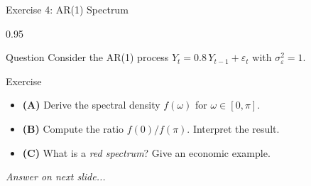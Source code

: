 \documentclass[9pt, aspectratio=169, t]{beamer}
\begin{document}
\begin{frame}{Exercise 4: AR(1) Spectrum}
    \begin{cminipage}{0.95\textwidth}
    \begin{alertblock}{Question}
        Consider the AR(1) process $Y_t = 0.8\,Y_{t-1} + \varepsilon_t$ with $\sigma^2_\varepsilon = 1$.
    \end{alertblock}

    \vspace{0.2cm}

    \begin{block}{Exercise}
        \begin{itemize}\setlength{\itemsep}{3pt}
            \item \textcolor{MainBlue}{\textbf{(A)}} Derive the spectral density $f(\omega)$ for $\omega \in [0, \pi]$.
            \item \textcolor{MainBlue}{\textbf{(B)}} Compute the ratio $f(0)/f(\pi)$. Interpret the result.
            \item \textcolor{MainBlue}{\textbf{(C)}} What is a \emph{red spectrum}? Give an economic example.
        \end{itemize}
    \end{block}

    \vspace{0.3cm}

    \begin{center}
        \textit{Answer on next slide...}
    \end{center}
    \end{cminipage}
\end{frame}
\end{document}
